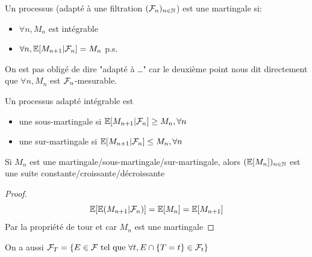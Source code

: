\documentclass[]{report}
\begin{document}
    \begin{df}{}{}
        Un processus (adapté à une filtration $(\mathcal{F}_n)_{n\in\mathbb{N}}$) est une martingale si:
        \begin{itemize}
            \item $\forall n, M_n$ est intégrable
            \item $\forall n, \mathbb{E}[M_{n+1}|\mathcal{F}_n]=M_n$ p.s.
        \end{itemize}
    \end{df}

    \begin{re}{}{}
        On est pas obligé de dire "adapté à \ldots" car le deuxième point nous dit directement que $\forall n, M_n$ est $\mathcal{F}_n$-mesurable.
    \end{re}

    \begin{df}{}{}
        Un processus adapté intégrable est 
        \begin{itemize}
            \item une sous-martingale si $\mathbb{E}[M_{n+1}|\mathcal{F}_n]\ge M_n,\forall n$
            \item une sur-martingale si $\mathbb{E}[M_{n+1}|\mathcal{F}_n]\le M_n,\forall n$
        \end{itemize}
    \end{df}

    \begin{prop}{}{}
        Si $M_n$ est une martingale/sous-martingale/sur-martingale, alors $(\mathbb{E}[M_n])_{n\in\mathbb{N}}$ est une suite constante/croissante/décroissante
    \end{prop}

    \begin{proof}
        \[\mathbb{E}[\mathbb{E}(M_{n+1}|\mathcal{F}_n)]=\mathbb{E}[M_n]=\mathbb{E}[M_{n+1}]\]
        Par la propriété de tour et car $M_n$ est une martingale
    \end{proof}

    \begin{prop}{}{}
        On a aussi $\mathcal{F}_T=\{E\in \mathcal{F}\text{ tel que }\forall t, E\cap\{T=t\}\in \mathcal{F}_t\}$
    \end{prop}
\end{document}
